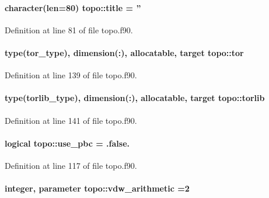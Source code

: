 \hypertarget{classtopo_aeed5c7dad044f283eead0024edd1c4d2}{
\paragraph[{title}]{\setlength{\rightskip}{0pt plus 5cm}character(len=80) topo\-::title = ''}}\label{classtopo_aeed5c7dad044f283eead0024edd1c4d2}


Definition at line 81 of file topo.\-f90.

\hypertarget{classtopo_ae6ee33b8bdbc8bdccb2419ed9fda07a6}{
\paragraph[{tor}]{\setlength{\rightskip}{0pt plus 5cm}type({\bf tor\-\_\-type}), dimension(\-:), allocatable, target topo\-::tor}}\label{classtopo_ae6ee33b8bdbc8bdccb2419ed9fda07a6}


Definition at line 139 of file topo.\-f90.

\hypertarget{classtopo_ad251840e17aa9a480795470371c954f1}{
\paragraph[{torlib}]{\setlength{\rightskip}{0pt plus 5cm}type({\bf torlib\-\_\-type}), dimension(\-:), allocatable, target topo\-::torlib}}\label{classtopo_ad251840e17aa9a480795470371c954f1}


Definition at line 141 of file topo.\-f90.

\hypertarget{classtopo_aa8f6e5af5947f84992ab2b021b47bc7b}{
\paragraph[{use\-\_\-pbc}]{\setlength{\rightskip}{0pt plus 5cm}logical topo\-::use\-\_\-pbc = .false.}}\label{classtopo_aa8f6e5af5947f84992ab2b021b47bc7b}


Definition at line 117 of file topo.\-f90.

\hypertarget{classtopo_a62176dc452e3f5a13dff7365a45edfb6}{
\paragraph[{vdw\-\_\-arithmetic}]{\setlength{\rightskip}{0pt plus 5cm}integer, parameter topo\-::vdw\-\_\-arithmetic =2}}\label{classtopo_a62176dc452e3f5a13dff7365a45edfb6}


